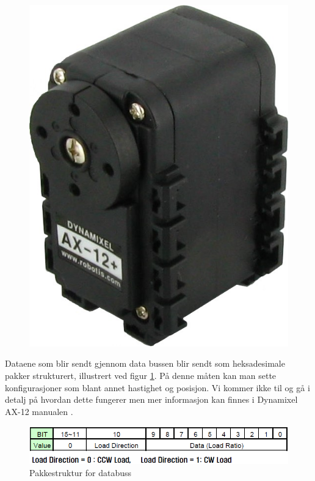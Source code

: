 \documentclass[12pt]{report}
\begin{document}
\begin{figure}[h!]
	\includegraphics[scale=0.3]{imgs/servo_ax12-5}
	\centering
\end{figure}

Dataene som blir sendt gjennom data bussen blir sendt som heksadesimale pakker strukturert, illustrert ved figur \ref{pkg}. På denne måten kan man sette konfigurasjoner som blant annet hastighet og posisjon. Vi kommer ikke til og gå i detalj på hvordan dette fungerer men mer informasjon kan finnes i Dynamixel AX-12 manualen \cite{Dynamixel}.

\begin{figure}[h!]
	\includegraphics[scale=0.5]{imgs/dxl_presentload}
	\centering
	\caption{Pakkestruktur for databuss}	
	\label{pkg}
\end{figure}
\end{document}
